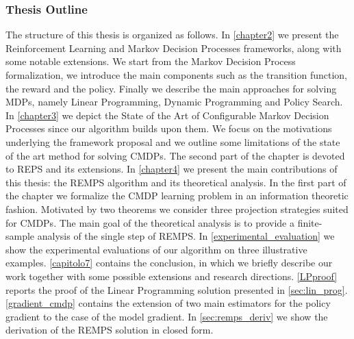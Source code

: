 \subsubsection{Thesis Outline}
The structure of this thesis is organized as follows.
In \cref{chapter2} we present the Reinforcement Learning and Markov Decision Processes frameworks, along with some notable extensions. We start from the Markov Decision Process formalization, we introduce the main components such as the transition function, the reward and the policy. Finally we describe the main approaches for solving MDPs, namely Linear Programming, Dynamic Programming and Policy Search. \newline
In \cref{chapter3} we depict the State of the Art of Configurable Markov Decision Processes since our algorithm builds upon them. We focus on the motivations underlying the framework proposal and we outline some limitations of the state of the art method for solving CMDPs. The second part of the chapter is devoted to REPS and its extensions. \newline
In \cref{chapter4} we present the main contributions of this thesis: the REMPS algorithm and its theoretical analysis. In the first part of the chapter we formalize the CMDP learning problem in an information theoretic fashion. Motivated by two theorems we consider three projection strategies suited for CMDPs. The main goal of the theoretical analysis is to provide a finite-sample analysis of the single step of REMPS. \newline
In \cref{experimental_evaluation} we show the experimental evaluations of our algorithm on three illustrative examples. \newline
\cref{capitolo7} contains the conclusion, in which we briefly describe our work together with some possible extensions and research directions. \newline
\cref{LPproof} reports the proof of the Linear Programming solution presented in \cref{sec:lin_prog}.
\cref{gradient_cmdp} contains the extension of two main estimators for the policy gradient to the case of the model gradient. 
In \cref{sec:remps_deriv} we show the derivation of the REMPS solution in closed form.